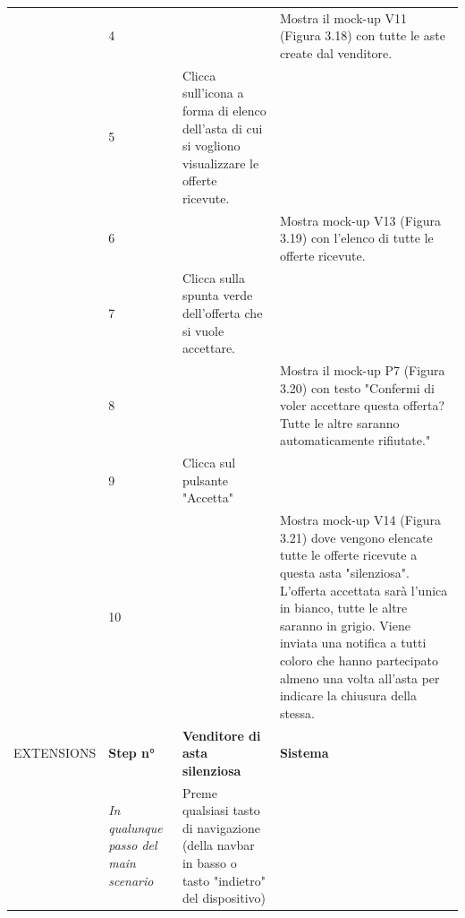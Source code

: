 \begin{longtable}{|C{3.0cm}|C{1.3cm}|L{5.2cm}|L{5.2cm}|}
                        & 4
                        & 
                        & Mostra il mock-up V11 (Figura 3.18) con tutte le aste create dal venditore.\\
                        & 5
                        & Clicca sull'icona a forma di elenco dell'asta di cui si vogliono visualizzare le offerte ricevute.
                        & \\
                        & 6
                        & 
                        & Mostra mock-up V13 (Figura 3.19) con l'elenco di tutte le offerte ricevute.\\
                        & 7
                        & Clicca sulla spunta verde dell'offerta che si vuole accettare.
                        & \\
                        & 8
                        & 
                        & Mostra il mock-up P7 (Figura 3.20) con testo "Confermi di voler accettare questa offerta? Tutte le altre saranno automaticamente rifiutate."\\
                        & 9
                        & Clicca sul pulsante "Accetta"
                        & \\
                        & 10
                        & 
                        & Mostra mock-up V14 (Figura 3.21) dove vengono elencate tutte le offerte ricevute a questa asta "silenziosa". L'offerta accettata sarà l'unica in bianco, tutte le altre saranno in grigio. Viene inviata una notifica a tutti coloro che hanno partecipato almeno una volta all'asta per indicare la chiusura della stessa.\\
                \hline
                    EXTENSIONS
                    & \textbf{Step n°} 
                    & \textbf{Venditore di asta silenziosa} 
                    & \textbf{Sistema}\\
                \hline
                        & \textit{In qualunque passo del main scenario}
                        & Preme qualsiasi tasto di navigazione (della navbar in basso o tasto "indietro" del dispositivo)
                        & \\

\end{longtable}
